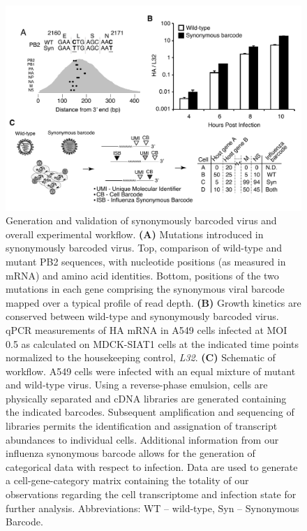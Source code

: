 \documentclass[9pt,lineno]{elife}
\begin{document}
\begin{figure}
\includegraphics[width=0.8\linewidth]{figures/Workflow/workflow.pdf}
\caption{\label{fig:workflow} Generation and validation of synonymously barcoded virus and overall experimental workflow.
{\bf (A)}  Mutations introduced in synonymously barcoded virus. Top, comparison of wild-type and mutant PB2 sequences, with nucleotide positions (as measured in mRNA) and amino acid identities. Bottom, positions of the two mutations in each gene comprising the synonymous viral barcode mapped over a typical profile of read depth.
{\bf (B)} Growth kinetics are conserved between wild-type and synonymously barcoded virus. qPCR measurements of HA mRNA in A549 cells infected at MOI 0.5 as calculated on MDCK-SIAT1 cells at the indicated time points normalized to the housekeeping control, \emph{L32}.
{\bf (C)}  Schematic of workflow. A549 cells were infected with an equal mixture of mutant and wild-type virus. Using a reverse-phase emulsion, cells are physically separated and cDNA libraries are generated containing the indicated barcodes. Subsequent amplification and sequencing of libraries permits the identification and assignation of transcript abundances to individual cells. Additional information from our influenza synonymous barcode allows for the generation of categorical data with respect to infection. Data are used to generate a cell-gene-category matrix containing the totality of our observations regarding the cell transcriptome and infection state for further analysis. Abbreviations: WT -- wild-type, Syn -- Synonymous Barcode.
}
\end{figure}
\end{document}
